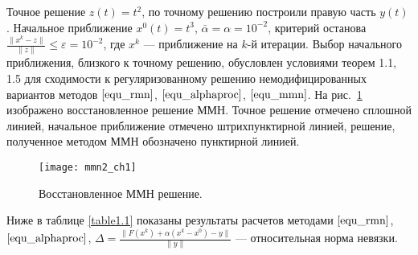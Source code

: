  Точное решение $z(t)=t^2$, по точному решению построили правую часть $y(t)$. Начальное приближение $x^0(t)=t^3$, $\bar\alpha=\alpha=10^{-2}$, критерий останова $\frac{\|x^k-z\|}{\|z\|}\le\varepsilon=10^{-2}$, где $x^k$ --- приближение на $k$-й итерации. Выбор начального приближения, близкого к точному решению, обусловлен условиями теорем 1.1, 1.5 для сходимости к регуляризованному решению немодифицированных вариантов методов $\eqref{equ_rmn}$, $\eqref{equ_alphaproc}$, $\eqref{equ_mmn}$. 
 На рис.~\ref{fig:mmn_ch1} изображено восстановленное решение ММН. Точное решение отмечено сплошной линией, начальное приближение отмечено штрихпунктирной линией, решение, полученное методом ММН обозначено пунктирной линией. 
\begin{figure}[h]
	\centering
	\texttt{[image: mmn2\_ch1]}
	\caption{Восстановленное ММН решение.}
	\label{fig:mmn_ch1}
\end{figure}
Ниже в таблице \ref{table1.1} показаны результаты расчетов методами $\eqref{equ_rmn}$, $\eqref{equ_alphaproc}$, $\Delta=\frac{\|F(x^k)+\alpha(x^k-x^0)-y\|}{\|y\|}$ --- относительная норма невязки. 
